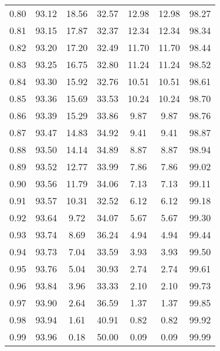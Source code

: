 \begin{tabular}{|c|c|c|c|c|c|c|}
      0.80 &     93.12 &     18.56 &      32.57 &   12.98 &      12.98 &         98.27 \\
      0.81 &     93.15 &     17.87 &      32.37 &   12.34 &      12.34 &         98.34 \\
      0.82 &     93.20 &     17.20 &      32.49 &   11.70 &      11.70 &         98.44 \\
      0.83 &     93.25 &     16.75 &      32.80 &   11.24 &      11.24 &         98.52 \\
      0.84 &     93.30 &     15.92 &      32.76 &   10.51 &      10.51 &         98.61 \\
      0.85 &     93.36 &     15.69 &      33.53 &   10.24 &      10.24 &         98.70 \\
      0.86 &     93.39 &     15.29 &      33.86 &    9.87 &       9.87 &         98.76 \\
      0.87 &     93.47 &     14.83 &      34.92 &    9.41 &       9.41 &         98.87 \\
      0.88 &     93.50 &     14.14 &      34.89 &    8.87 &       8.87 &         98.94 \\
      0.89 &     93.52 &     12.77 &      33.99 &    7.86 &       7.86 &         99.02 \\
      0.90 &     93.56 &     11.79 &      34.06 &    7.13 &       7.13 &         99.11 \\
      0.91 &     93.57 &     10.31 &      32.52 &    6.12 &       6.12 &         99.18 \\
      0.92 &     93.64 &      9.72 &      34.07 &    5.67 &       5.67 &         99.30 \\
      0.93 &     93.74 &      8.69 &      36.24 &    4.94 &       4.94 &         99.44 \\
      0.94 &     93.73 &      7.04 &      33.59 &    3.93 &       3.93 &         99.50 \\
      0.95 &     93.76 &      5.04 &      30.93 &    2.74 &       2.74 &         99.61 \\
      0.96 &     93.84 &      3.96 &      33.33 &    2.10 &       2.10 &         99.73 \\
      0.97 &     93.90 &      2.64 &      36.59 &    1.37 &       1.37 &         99.85 \\
      0.98 &     93.94 &      1.61 &      40.91 &    0.82 &       0.82 &         99.92 \\
      0.99 &     93.96 &      0.18 &      50.00 &    0.09 &       0.09 &         99.99 \\
\bottomrule
\end{tabular}
